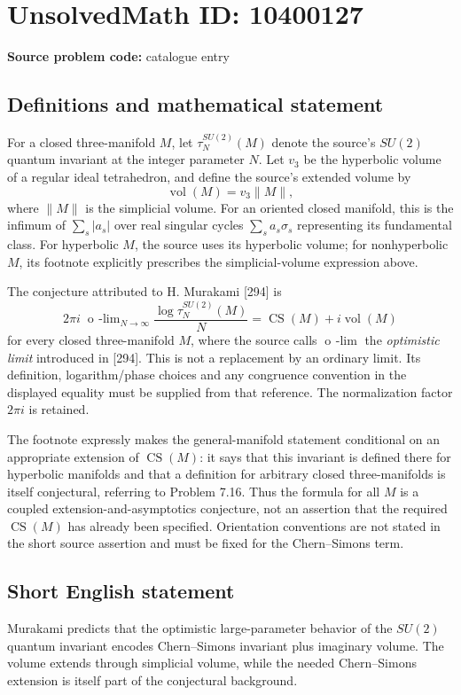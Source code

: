 \documentclass[11pt]{article}
\begin{document}
\section*{UnsolvedMath ID: 10400127}
\textbf{Source problem code:} catalogue entry
\subsection{Definitions and mathematical statement}
For a closed three-manifold \(M\), let \(\tau_N^{SU(2)}(M)\) denote the source's \(SU(2)\) quantum invariant at the integer parameter \(N\). Let \(v_3\) be the hyperbolic volume of a regular ideal tetrahedron, and define the source's extended volume by
\[\operatorname{vol}(M)=v_3\lVert M\rVert,\]
where \(\lVert M\rVert\) is the simplicial volume. For an oriented closed manifold, this is the infimum of \(\sum_s|a_s|\) over real singular cycles \(\sum_s a_s\sigma_s\) representing its fundamental class. For hyperbolic \(M\), the source uses its hyperbolic volume; for nonhyperbolic \(M\), its footnote explicitly prescribes the simplicial-volume expression above.

The conjecture attributed to H. Murakami [294] is
\[2\pi i\;\operatorname{o\!\!\!\!-lim}_{N\to\infty}
\frac{\log\tau_N^{SU(2)}(M)}{N}
=\operatorname{CS}(M)+i\operatorname{vol}(M)\]
for every closed three-manifold \(M\), where the source calls \(\operatorname{o\!\!\!\!-lim}\) the \emph{optimistic limit} introduced in [294]. This is not a replacement by an ordinary limit. Its definition, logarithm/phase choices and any congruence convention in the displayed equality must be supplied from that reference. The normalization factor \(2\pi i\) is retained.

The footnote expressly makes the general-manifold statement conditional on an appropriate extension of \(\operatorname{CS}(M)\): it says that this invariant is defined there for hyperbolic manifolds and that a definition for arbitrary closed three-manifolds is itself conjectural, referring to Problem 7.16. Thus the formula for all \(M\) is a coupled extension-and-asymptotics conjecture, not an assertion that the required \(\operatorname{CS}(M)\) has already been specified. Orientation conventions are not stated in the short source assertion and must be fixed for the Chern--Simons term.
\subsection{Short English statement}
Murakami predicts that the optimistic large-parameter behavior of the \(SU(2)\) quantum invariant encodes Chern--Simons invariant plus imaginary volume. The volume extends through simplicial volume, while the needed Chern--Simons extension is itself part of the conjectural background.
\end{document}
